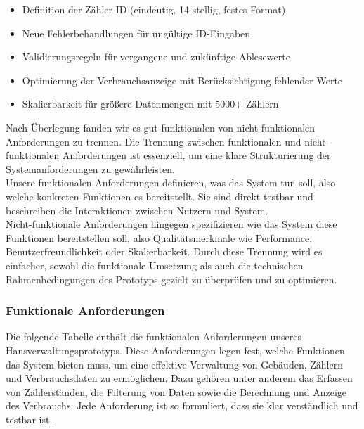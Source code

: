 \begin{itemize}
    \item Definition der Zähler-ID (eindeutig, 14-stellig, festes Format)
    \item Neue Fehlerbehandlungen für ungültige ID-Eingaben
    \item Validierungsregeln für vergangene und zukünftige Ablesewerte
    \item Optimierung der Verbrauchsanzeige mit Berücksichtigung fehlender Werte
    \item Skalierbarkeit für größere Datenmengen mit 5000+ Zählern
\end{itemize}

Nach Überlegung fanden wir es gut funktionalen von nicht funktionalen Anforderungen zu trennen.
Die Trennung zwischen funktionalen und nicht-funktionalen Anforderungen ist essenziell, um eine klare Strukturierung der Systemanforderungen zu gewährleisten.\\
Unsere funktionalen Anforderungen definieren, was das System tun soll, also welche konkreten Funktionen es bereitstellt.
Sie sind direkt testbar und beschreiben die Interaktionen zwischen Nutzern und System.\\
Nicht-funktionale Anforderungen hingegen spezifizieren wie das System diese Funktionen bereitstellen soll, also Qualitätsmerkmale wie Performance, Benutzerfreundlichkeit oder Skalierbarkeit.
Durch diese Trennung wird es einfacher, sowohl die funktionale Umsetzung als auch die technischen Rahmenbedingungen des Prototyps gezielt zu überprüfen und zu optimieren.

\subsubsection{Funktionale Anforderungen}

Die folgende Tabelle enthält die funktionalen Anforderungen unseres Hausverwaltungsprototyps.
Diese Anforderungen legen fest, welche Funktionen das System bieten muss, um eine effektive Verwaltung von Gebäuden, Zählern und Verbrauchsdaten zu ermöglichen.
Dazu gehören unter anderem das Erfassen von Zählerständen, die Filterung von Daten sowie die Berechnung und Anzeige des Verbrauchs.
Jede Anforderung ist so formuliert, dass sie klar verständlich und testbar ist.


